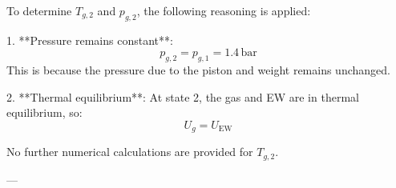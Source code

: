 To determine \( T_{g,2} \) and \( p_{g,2} \), the following reasoning is applied:

1. **Pressure remains constant**:  
   \[
   p_{g,2} = p_{g,1} = 1.4 \, \text{bar}
   \]  
   This is because the pressure due to the piston and weight remains unchanged.

2. **Thermal equilibrium**:  
   At state 2, the gas and EW are in thermal equilibrium, so:  
   \[
   U_g = U_{\text{EW}}
   \]  

No further numerical calculations are provided for \( T_{g,2} \).  

---